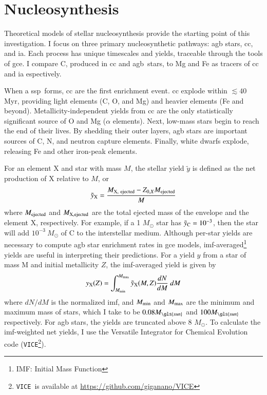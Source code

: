 \documentclass[12pt,oneside,letterpaper]{report}
\newcommand{\cc}{\gls{cc}}
\newcommand{\agb}{\gls{agb}}
\newcommand{\ia}{\gls{ia}}
\newcommand{\ssp}{\gls{ssp}}
\newcommand{\imf}{\gls{imf}}
\newcommand{\gce}{\gls{gce}}
\newcommand{\sun}{\gls{sun}}
\newcommand{\VICE}{\texttt{VICE}}
\begin{document}
\chapter{Nucleosynthesis}

Theoretical models of stellar nucleosynthesis provide the starting point of this investigation. I focus on three primary nucleosynthetic pathways: \agb{} stars, \cc{}, and \ia. Each process has unique timescales and yields, traceable through the tools of \gce. I compare C, produced in \cc{} and \agb\ stars, to Mg and Fe as tracers of \cc{} and \ia{} espectively.

When a \ssp~forms, \cc{} are the first enrichment event. \cc{}  explode within $\lesssim 40$ Myr, providing light elements (C, O, and Mg) and heavier elements (Fe and beyond). Metallicity-independent yields from \cc{} are the only statistically significant source of O and Mg ($\alpha$ elements). Next, low-mass stars begin to reach the end of their lives. By shedding their outer layers, \agb{} stars are important sources of C, N, and neutron capture elements.  Finally, white dwarfs explode, releasing Fe and other iron-peak elements.


For an element X and star with mass $M$, the stellar yield $\tilde{y}$ is defined as the net production of X relative to $M$, or
\begin{equation}
    \tilde{y}_{\rm X} = \frac{M_{\rm X,\ ejected} - Z_{0, X} M_{\rm ejected}}{M}   
\end{equation}
where $M_{\rm ejected}$ and $M_{\rm X, ejected}$  are the total ejected mass of the envelope and the element X, respectively. For example, if a 1 $M_\odot$ star has $\tilde{y}_{\rm C} = 10^{-3}$, then the star will add $10^{-3}\ M_\odot$ of C to the interstellar medium. 
Although per-star yields are necessary to compute \agb{} star enrichment rates in \gce{}  models, \imf-averaged\footnote{IMF: Initial Mass Function} yields are useful in interpreting their predictions. For a yield $y$ from a star of mass M and initial metallicity $Z$, the \imf-averaged yield is given by 
\begin{equation} \label{eq:imf-yield}
    y_{\rm X}(Z) = 
    \int_{M_{\rm min}}^{M_{\rm max}} 
    \tilde{y}_{\rm X}(M, Z)
    \frac{dN}{dM}  \ dM
\end{equation}
where ${dN}/{dM}$ is the normalized \imf, and $M_{\rm min}$ and $M_{\rm max}$ are the minimum and maximum mass of stars, which I take to be $0.08 M_{\sun}$ and $100 M_{\sun}$ respectively. For \agb{} stars, the yields are truncated above 8 $M_{\odot}$. 
To calculate the \imf-weighted net yields, I use the Versatile Integrator for Chemical Evolution code (\VICE\footnote{\VICE~is available at \url{https://github.com/giganano/VICE}}).
\end{document}
